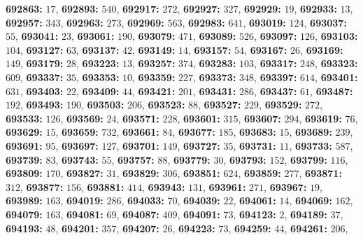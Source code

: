 \textsf{\bfseries 692863:} $17$, \textsf{\bfseries 692893:} $540$, \textsf{\bfseries 692917:} $272$, \textsf{\bfseries 692927:} $327$, \textsf{\bfseries 692929:} $19$, \textsf{\bfseries 692933:} $13$, \textsf{\bfseries 692957:} $343$, \textsf{\bfseries 692963:} $273$, \textsf{\bfseries 692969:} $563$, \textsf{\bfseries 692983:} $641$, \textsf{\bfseries 693019:} $124$, \textsf{\bfseries 693037:} $55$, \textsf{\bfseries 693041:} $23$, \textsf{\bfseries 693061:} $190$, \textsf{\bfseries 693079:} $471$, \textsf{\bfseries 693089:} $526$, \textsf{\bfseries 693097:} $126$, \textsf{\bfseries 693103:} $104$, \textsf{\bfseries 693127:} $63$, \textsf{\bfseries 693137:} $42$, \textsf{\bfseries 693149:} $14$, \textsf{\bfseries 693157:} $54$, \textsf{\bfseries 693167:} $26$, \textsf{\bfseries 693169:} $149$, \textsf{\bfseries 693179:} $28$, \textsf{\bfseries 693223:} $13$, \textsf{\bfseries 693257:} $374$, \textsf{\bfseries 693283:} $103$, \textsf{\bfseries 693317:} $248$, \textsf{\bfseries 693323:} $609$, \textsf{\bfseries 693337:} $35$, \textsf{\bfseries 693353:} $10$, \textsf{\bfseries 693359:} $227$, \textsf{\bfseries 693373:} $348$, \textsf{\bfseries 693397:} $614$, \textsf{\bfseries 693401:} $631$, \textsf{\bfseries 693403:} $22$, \textsf{\bfseries 693409:} $44$, \textsf{\bfseries 693421:} $201$, \textsf{\bfseries 693431:} $286$, \textsf{\bfseries 693437:} $61$, \textsf{\bfseries 693487:} $192$, \textsf{\bfseries 693493:} $190$, \textsf{\bfseries 693503:} $206$, \textsf{\bfseries 693523:} $88$, \textsf{\bfseries 693527:} $229$, \textsf{\bfseries 693529:} $272$, \textsf{\bfseries 693533:} $126$, \textsf{\bfseries 693569:} $24$, \textsf{\bfseries 693571:} $228$, \textsf{\bfseries 693601:} $315$, \textsf{\bfseries 693607:} $294$, \textsf{\bfseries 693619:} $76$, \textsf{\bfseries 693629:} $15$, \textsf{\bfseries 693659:} $732$, \textsf{\bfseries 693661:} $84$, \textsf{\bfseries 693677:} $185$, \textsf{\bfseries 693683:} $15$, \textsf{\bfseries 693689:} $239$, \textsf{\bfseries 693691:} $95$, \textsf{\bfseries 693697:} $127$, \textsf{\bfseries 693701:} $149$, \textsf{\bfseries 693727:} $35$, \textsf{\bfseries 693731:} $11$, \textsf{\bfseries 693733:} $587$, \textsf{\bfseries 693739:} $83$, \textsf{\bfseries 693743:} $55$, \textsf{\bfseries 693757:} $88$, \textsf{\bfseries 693779:} $30$, \textsf{\bfseries 693793:} $152$, \textsf{\bfseries 693799:} $116$, \textsf{\bfseries 693809:} $170$, \textsf{\bfseries 693827:} $31$, \textsf{\bfseries 693829:} $306$, \textsf{\bfseries 693851:} $624$, \textsf{\bfseries 693859:} $277$, \textsf{\bfseries 693871:} $312$, \textsf{\bfseries 693877:} $156$, \textsf{\bfseries 693881:} $414$, \textsf{\bfseries 693943:} $131$, \textsf{\bfseries 693961:} $271$, \textsf{\bfseries 693967:} $19$, \textsf{\bfseries 693989:} $163$, \textsf{\bfseries 694019:} $286$, \textsf{\bfseries 694033:} $70$, \textsf{\bfseries 694039:} $22$, \textsf{\bfseries 694061:} $14$, \textsf{\bfseries 694069:} $162$, \textsf{\bfseries 694079:} $163$, \textsf{\bfseries 694081:} $69$, \textsf{\bfseries 694087:} $409$, \textsf{\bfseries 694091:} $73$, \textsf{\bfseries 694123:} $2$, \textsf{\bfseries 694189:} $37$, \textsf{\bfseries 694193:} $48$, \textsf{\bfseries 694201:} $357$, \textsf{\bfseries 694207:} $26$, \textsf{\bfseries 694223:} $73$, \textsf{\bfseries 694259:} $44$, \textsf{\bfseries 694261:} $206$, 
